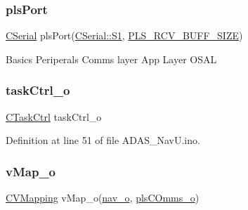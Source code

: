 \mbox{\label{_a_d_a_s___nav_u_8ino_a5427ed2b254fc7bb97bb9c8b92af7d60}} 
\subsubsection{\texorpdfstring{plsPort}{plsPort}}
{\footnotesize\ttfamily \mbox{\hyperlink{class_c_serial}{C\+Serial}} pls\+Port(\mbox{\hyperlink{class_c_serial_a000039540cc90b18bafacf5744e7eda2a2a245d3c55e5b6e7052daf261924ce08}{C\+Serial\+::\+S1}}, \mbox{\hyperlink{_a_d_a_s___cfg_8h_a00f72db64cf681b08d61977df126ec76}{P\+L\+S\+\_\+\+R\+C\+V\+\_\+\+B\+U\+F\+F\+\_\+\+S\+I\+ZE}})}

Basics Periperals Comms layer App Layer O\+S\+AL \mbox{\label{_a_d_a_s___nav_u_8ino_a4e98d90206033e0ef6b58d0d11930bac}} 
\subsubsection{\texorpdfstring{taskCtrl\_o}{taskCtrl\_o}}
{\footnotesize\ttfamily \mbox{\hyperlink{class_c_task_ctrl}{C\+Task\+Ctrl}} task\+Ctrl\+\_\+o}



Definition at line 51 of file A\+D\+A\+S\+\_\+\+Nav\+U.\+ino.

\mbox{\label{_a_d_a_s___nav_u_8ino_a0c99773e7f5600fecea038efac852ddc}} 
\subsubsection{\texorpdfstring{vMap\_o}{vMap\_o}}
{\footnotesize\ttfamily \mbox{\hyperlink{class_c_v_mapping}{C\+V\+Mapping}} v\+Map\+\_\+o(\mbox{\hyperlink{_a_d_a_s___nav_u_8ino_a8abc3c3b0c6950fd83525420d5ca0dd2}{nav\+\_\+o}}, \mbox{\hyperlink{_a_d_a_s___nav_u_8ino_add0df3806d74ba741b1d6bc5452d7e79}{pls\+C\+Omms\+\_\+o}})}

